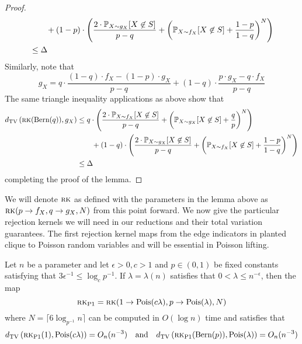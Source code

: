 \begin{proof}
\begin{align*}
&\quad \quad + (1 - p) \cdot \left( \frac{2 \cdot \mathbb{P}_{X \sim g_X} [X \not \in S]}{p - q} + \left( \mathbb{P}_{X \sim f_X}[X \not \in S] + \frac{1 - p}{1 - q} \right)^{N} \right) \\
&\le \Delta
\end{align*}
Similarly, note that
$$g_X = q \cdot \frac{(1 - q) \cdot f_X - (1 - p) \cdot g_X}{p - q} + (1 - q) \cdot \frac{p \cdot g_X - q \cdot f_X}{p - q}$$
The same triangle inequality applications as above show that
\begin{align*}
d_{\text{TV}}\left( \textsc{rk}(\text{Bern}(q)), g_X \right) &\le q \cdot \left( \frac{2 \cdot \mathbb{P}_{X \sim f_X} [X \not \in S]}{p - q} + \left( \mathbb{P}_{X \sim g_X}[X \not \in S] + \frac{q}{p} \right)^{N} \right) \\
&\quad \quad + (1 - q) \cdot \left( \frac{2 \cdot \mathbb{P}_{X \sim g_X} [X \not \in S]}{p - q} + \left( \mathbb{P}_{X \sim f_X}[X \not \in S] + \frac{1 - p}{1 - q} \right)^{N} \right) \\
&\le \Delta
\end{align*}
completing the proof of the lemma.
\end{proof}

We will denote $\textsc{rk}$ as defined with the parameters in the lemma above as $\textsc{rk}(p \to f_X, q \to g_X, N)$ from this point forward. We now give the particular rejection kernels we will need in our reductions and their total variation guarantees. The first rejection kernel maps from the edge indicators in planted clique to Poisson random variables and will be essential in Poisson lifting.

\begin{lemma} \label{lem:5a}
Let $n$ be a parameter and let $\epsilon > 0, c > 1$ and $p \in (0, 1)$ be fixed constants satisfying that $3\epsilon^{-1} \le \log_c p^{-1}$. If $\lambda = \lambda(n)$ satisfies that $0 < \lambda \le n^{-\epsilon}$, then the map
$$\textsc{rk}_{\text{P1}} = \textsc{rk}(1 \to \text{Pois}(c\lambda), p \to \text{Pois}(\lambda), N)$$
where $N = \lceil 6 \log_{p^{-1}} n \rceil$ can be computed in $O(\log n)$ time and satisfies that
$$d_{\text{TV}}\left(\textsc{rk}_{\text{P1}}(1), \text{Pois}(c\lambda) \right) = O_n(n^{-3}) \quad \text{and} \quad d_{\text{TV}}\left(\textsc{rk}_{\text{P1}}(\text{Bern}(p)), \text{Pois}(\lambda) \right) = O_n(n^{-3})$$
\end{lemma}

